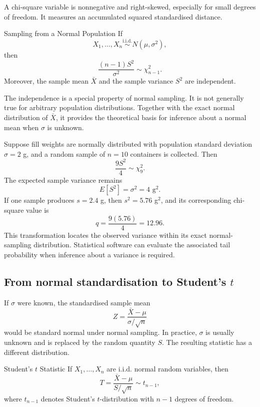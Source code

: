 A chi-square variable is nonnegative and right-skewed, especially for small degrees of freedom. It measures an accumulated squared standardised distance.

\begin{theorem}{Sampling from a Normal Population}
If
\[
    X_1,\ldots,X_n\overset{\mathrm{i.i.d.}}{\sim}N(\mu,\sigma^2),
\]
then
\[
    \frac{(n-1)S^2}{\sigma^2}\sim\chi^2_{n-1}.
\]
Moreover, the sample mean $\bar X$ and the sample variance $S^2$ are independent.
\end{theorem}

The independence is a special property of normal sampling. It is not generally true for arbitrary population distributions. Together with the exact normal distribution of $\bar X$, it provides the theoretical basis for inference about a normal mean when $\sigma$ is unknown.

\begin{example}\par
Suppose fill weights are normally distributed with population standard deviation $\sigma=2$ g, and a random sample of $n=10$ containers is collected. Then
\[
    \frac{9S^2}{4}\sim\chi^2_9.
\]
The expected sample variance remains
\[
    E[S^2]=\sigma^2=4\text{ g}^2.
\]
If one sample produces $s=2.4$ g, then $s^2=5.76$ g$^2$, and its corresponding chi-square value is
\[
    q=\frac{9(5.76)}{4}=12.96.
\]
This transformation locates the observed variance within its exact normal-sampling distribution. Statistical software can evaluate the associated tail probability when inference about a variance is required.
\end{example}

\subsection{From normal standardisation to Student's $t$}

If $\sigma$ were known, the standardised sample mean
\[
    Z=\frac{\bar X-\mu}{\sigma/\sqrt n}
\]
would be standard normal under normal sampling. In practice, $\sigma$ is usually unknown and is replaced by the random quantity $S$. The resulting statistic has a different distribution.

\begin{theorem}{Student's $t$ Statistic}
If $X_1,\ldots,X_n$ are i.i.d. normal random variables, then
\[
    T=\frac{\bar X-\mu}{S/\sqrt n}
      \sim t_{n-1},
\]
where $t_{n-1}$ denotes Student's $t$-distribution with $n-1$ degrees of freedom.
\end{theorem}

